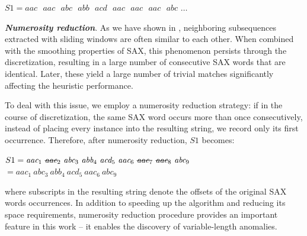 \documentclass{llncs}
\newcommand{\msout}[1]{\text{\sout{\ensuremath{#1}}}}
\begin{document}


\begin{center} 
$S1 = \textit{aac~ aac~ abc~ abb~ acd~ aac~ aac~ aac~ abc~} \dots$
\end{center}

\textit{\textbf{Numerosity reduction}}. As we have shown in \cite{lin_motifs}, neighboring subsequences extracted with sliding windows are often similar to each other. When combined with the smoothing properties of SAX, this phenomenon persists through the discretization, resulting in a large number of consecutive SAX words that are identical. Later, these yield a large number of trivial matches significantly affecting the heuristic performance. 

To deal with this issue, we employ a numerosity reduction strategy: if in the course of discretization, the same SAX word occurs more than once consecutively, instead of placing every instance into the resulting string, we record only its first occurrence. Therefore, after numerosity reduction, $S1$ becomes:
\begin{center}
 $S1 = \textit{aac}_{1}~ \msout{\textit{aac}}_{2}~ \textit{abc}_{3}~ \textit{abb}_{4}~ \textit{acd}_{5}~ \textit{aac}_{6}~ \msout{\textit{aac}}_{7}~ \msout{\textit{aac}}_{8}~ \textit{abc}_{9}$ \\
 $ = \textit{aac}_{1}~ \textit{abc}_{3}~ \textit{abb}_{4}~ \textit{acd}_{5}~ \textit{aac}_{6}~ \textit{abc}_{9}$ 
\end{center}
where subscripts in the resulting string denote the offsets of the original SAX words occurrences. In addition to speeding up the algorithm and reducing its space requirements, numerosity reduction procedure provides an important feature in this work -- it enables the discovery of variable-length anomalies. 
\end{document}
